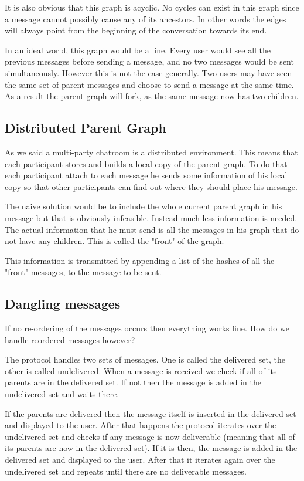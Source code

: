 It is also obvious that this graph is acyclic.
No cycles can exist in this graph since a message cannot possibly cause any of its ancestors.
In other words the edges will always point from the beginning of the conversation towards its end.

In an ideal world, this graph would be a line.
Every user would see  all the previous messages before sending a message, and no two messages would be sent simultaneously.
However this is not the case generally.
Two users may have seen the same set of parent messages and choose to send a message at the same time.
As a result the parent graph will fork, as the same message now has two children.

\subsection{Distributed Parent Graph}

As we said a multi-party chatroom is a distributed environment.
This means that each participant stores and builds a local copy of the parent graph.
To do that each participant attach to each message he sends some information of his local copy so that other participants can find out where they should place his message.

The naive solution would be to include the whole current parent graph in his message but that is obviously infeasible.
Instead much less information is needed.
The actual information that he must send is all the messages in his graph that do not have any children.
This is called the "front" of the graph.

This information is transmitted by appending a list of the hashes of all the "front" messages, to the message to be sent.

\subsection{Dangling messages}

If no re-ordering of the messages occurs then everything works fine.
How do we handle reordered messages however?

The protocol handles two sets of messages.
One is called the delivered set, the other is called undelivered.
When a message is received we check if all of its parents are in the delivered set.
If not then the message is added in the undelivered set and waits there.

If the parents are delivered then the message itself is inserted in the delivered  set and displayed to the user.
After that happens the protocol iterates over the undelivered set and checks if any message is now deliverable (meaning that all of its parents are now in the delivered set).
If it is then, the message is added in the delivered set and displayed to the user.
After that it iterates again over the undelivered set and repeats until there are no deliverable messages.

